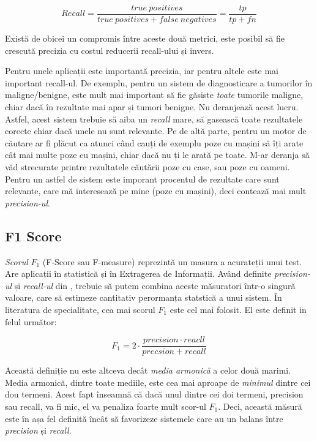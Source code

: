 \begin{equation}
Recall = \frac{true\ positives}{true\ positives + false\ negatives} = \frac{tp}{tp + fn}
\end{equation}

Există de obicei un compromis între aceste două metrici, este posibil să fie crescută 
precizia cu costul reducerii recall-ului și invers.

Pentru unele aplicații este importantă precizia, iar pentru altele este mai important recall-ul. De exemplu, pentru un sistem de diagnosticare a tumorilor în maligne/benigne, este mult mai important să fie găsiste \textit{toate} tumorile maligne, chiar dacă în rezultate mai apar și tumori benigne. Nu deranjează acest lucru. Astfel, acest sistem trebuie să aiba un \textit{recall} mare, să gasească toate rezultatele corecte chiar dacă unele nu sunt relevante. Pe de altă parte, pentru un motor de căutare ar fi plăcut ca atunci când cauți de exemplu poze cu mașini să îți arate cât mai multe poze cu mașini, chiar dacă nu ți le arată pe toate. M-ar deranja să văd strecurate printre rezultatele căutării poze cu case, sau poze cu oameni. Pentru un astfel de sistem este imporant procentul de rezultate care sunt relevante, care mă interesează pe mine (poze cu mașini), deci contează mai mult \textit{precision-ul}.

\subsection{F1 Score}

\textit{Scorul} $F_1$ (F-Score sau F-measure) reprezintă un masura a acurateții unui test. Are aplicații în statistică și în Extragerea de Informații. Având definite \textit{precision-ul} și \textit{recall-ul} din , trebuie să putem combina aceste măsuratori într-o singură valoare, care să estimeze cantitativ perormanța statstică a unui sistem. În literatura de specialitate, cea mai scorul $F_1$ este cel mai folosit. El este definit in felul următor:

\begin{equation}
F_{1} = 2 \cdot \frac{precision \cdot reacll}{precsion + recall}
\end{equation}

Această definiție nu este altceva decât \textit{media armonică} a celor două marimi. Media armonică, dintre toate mediile, este cea mai aproape de \textit{minimul} dintre cei dou termeni. Acest fapt înseamnă că dacă unul dintre cei doi termeni, precision sau recall, va fi mic, el va penaliza foarte mult scor-ul $F_1$. Deci, această măsură este în așa fel definită încât să favorizeze sistemele care au un balans între \textit{precision} și \textit{recall}.

